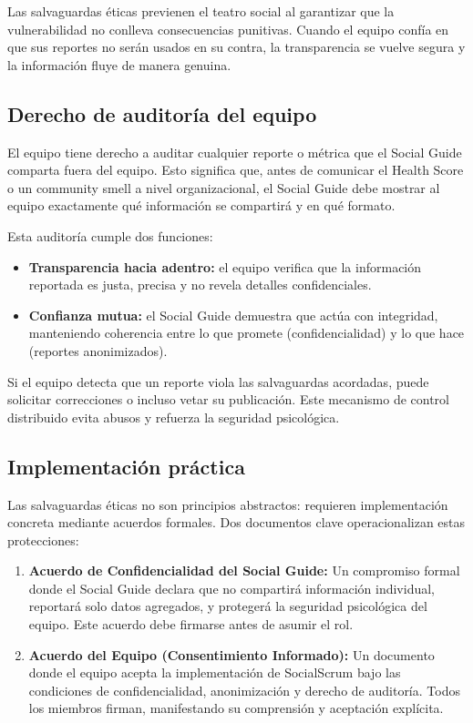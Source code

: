 Las salvaguardas éticas previenen el teatro social al garantizar que la vulnerabilidad no conlleva consecuencias punitivas. Cuando el equipo confía en que sus reportes no serán usados en su contra, la transparencia se vuelve segura y la información fluye de manera genuina.

\subsection{Derecho de auditoría del equipo}

El equipo tiene derecho a auditar cualquier reporte o métrica que el Social Guide comparta fuera del equipo. Esto significa que, antes de comunicar el Health Score o un community smell a nivel organizacional, el Social Guide debe mostrar al equipo exactamente qué información se compartirá y en qué formato.

Esta auditoría cumple dos funciones:

\begin{itemize}
    \item \textbf{Transparencia hacia adentro:} el equipo verifica que la información reportada es justa, precisa y no revela detalles confidenciales.
    \item \textbf{Confianza mutua:} el Social Guide demuestra que actúa con integridad, manteniendo coherencia entre lo que promete (confidencialidad) y lo que hace (reportes anonimizados).
\end{itemize}

Si el equipo detecta que un reporte viola las salvaguardas acordadas, puede solicitar correcciones o incluso vetar su publicación. Este mecanismo de control distribuido evita abusos y refuerza la seguridad psicológica.

\subsection{Implementación práctica}

Las salvaguardas éticas no son principios abstractos: requieren implementación concreta mediante acuerdos formales. Dos documentos clave operacionalizan estas protecciones:

\begin{enumerate}
    \item \textbf{Acuerdo de Confidencialidad del Social Guide:} Un compromiso formal donde el Social Guide declara que no compartirá información individual, reportará solo datos agregados, y protegerá la seguridad psicológica del equipo. Este acuerdo debe firmarse antes de asumir el rol.

    \item \textbf{Acuerdo del Equipo (Consentimiento Informado):} Un documento donde el equipo acepta la implementación de SocialScrum bajo las condiciones de confidencialidad, anonimización y derecho de auditoría. Todos los miembros firman, manifestando su comprensión y aceptación explícita.
\end{enumerate}

